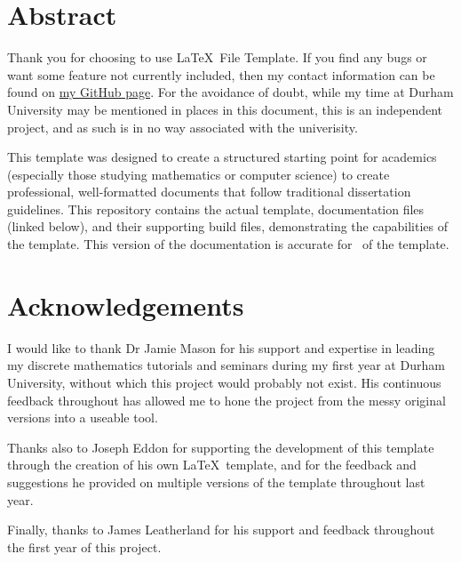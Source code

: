 \thispagestyle{empty}\section*{Abstract}

Thank you for choosing to use \LaTeX\ File Template. 
If you find any bugs or want some feature not currently included, then my contact information can be found on \href{https://github.com/MatthewEmer}{my GitHub page}. 
For the avoidance of doubt, while my time at Durham University may be mentioned in places in this document, this is an independent project, and as such is in no way associated with the univerisity.

This template was designed to create a structured starting point for academics (especially those studying mathematics or computer science) to create professional, well-formatted documents that follow traditional dissertation guidelines. 
This repository contains the actual template, documentation files (linked below), and their supporting build files, demonstrating the capabilities of the template. 
This version of the documentation is accurate for \templateVersion\ of the template.

\section*{Acknowledgements}

I would like to thank Dr Jamie Mason for his support and expertise in leading my discrete mathematics tutorials and seminars during my first year at Durham University, without which this project would probably not exist. 
His continuous feedback throughout has allowed me to hone the project from the messy original versions into a useable tool.

Thanks also to Joseph Eddon for supporting the development of this template through the creation of his own \LaTeX\ template, and for the feedback and suggestions he provided on multiple versions of the template throughout last year.

Finally, thanks to James Leatherland for his support and feedback throughout the first year of this project.